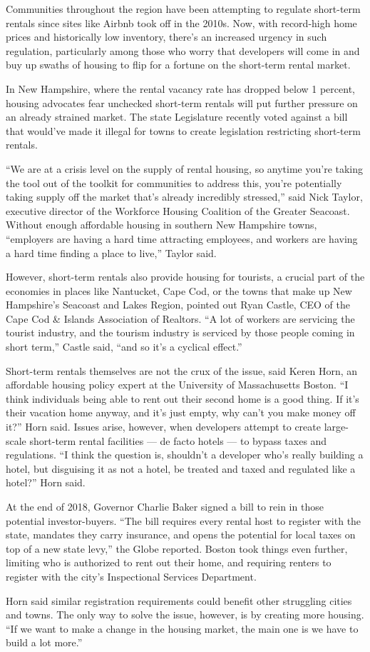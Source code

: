 Communities throughout the region have been attempting to regulate short-term rentals since sites like Airbnb took off in the 2010s. Now, with record-high home prices and historically low inventory, there's an increased urgency in such regulation, particularly among those who worry that developers will come in and buy up swaths of housing to flip for a fortune on the short-term rental market.


In New Hampshire, where the rental vacancy rate has dropped below 1 percent, housing advocates fear unchecked short-term rentals will put further pressure on an already strained market. The state Legislature recently voted against a bill that would've made it illegal for towns to create legislation restricting short-term rentals.


``We are at a crisis level on the supply of rental housing, so anytime you're taking the tool out of the toolkit for communities to address this, you're potentially taking supply off the market that's already incredibly stressed,'' said Nick Taylor, executive director of the Workforce Housing Coalition of the Greater Seacoast. Without enough affordable housing in southern New Hampshire towns, ``employers are having a hard time attracting employees, and workers are having a hard time finding a place to live,'' Taylor said.


However, short-term rentals also provide housing for tourists, a crucial part of the economies in places like Nantucket, Cape Cod, or the towns that make up New Hampshire's Seacoast and Lakes Region, pointed out Ryan Castle, CEO of the Cape Cod \& Islands Association of Realtors. ``A lot of workers are servicing the tourist industry, and the tourism industry is serviced by those people coming in short term,'' Castle said, ``and so it's a cyclical effect.''


Short-term rentals themselves are not the crux of the issue, said Keren Horn, an affordable housing policy expert at the University of Massachusetts Boston. ``I think individuals being able to rent out their second home is a good thing. If it's their vacation home anyway, and it's just empty, why can't you make money off it?'' Horn said. Issues arise, however, when developers attempt to create large-scale short-term rental facilities — de facto hotels — to bypass taxes and regulations. ``I think the question is, shouldn't a developer who's really building a hotel, but disguising it as not a hotel, be treated and taxed and regulated like a hotel?'' Horn said.


At the end of 2018, Governor Charlie Baker signed a bill to rein in those potential investor-buyers. ``The bill requires every rental host to register with the state, mandates they carry insurance, and opens the potential for local taxes on top of a new state levy,'' the Globe reported. Boston took things even further, limiting who is authorized to rent out their home, and requiring renters to register with the city's Inspectional Services Department.


Horn said similar registration requirements could benefit other struggling cities and towns. The only way to solve the issue, however, is by creating more housing. ``If we want to make a change in the housing market, the main one is we have to build a lot more.''